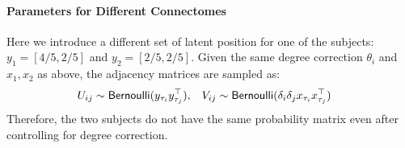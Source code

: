 \paragraph{Parameters for Different Connectomes}
Here we introduce a different set of latent position for one of the subjects: $y_1 = [4/5, 2/5]$ and $y_2 = [2/5, 2/5]$. Given the same degree correction $\theta_i$ and $x_1, x_2$ as above, the adjacency matrices are sampled as:
\begin{align*}
    U_{ij} \sim \operatorname{\mathsf{Bernoulli}}( y_{\tau_i} y_{\tau_j}^\top), \quad & V_{ij} \sim \operatorname{\mathsf{Bernoulli}}(\delta_i\delta_j x_{\tau_i} x_{\tau_j}^\top)
\end{align*}
Therefore, the two subjects do not have the same probability matrix even after controlling for degree correction.